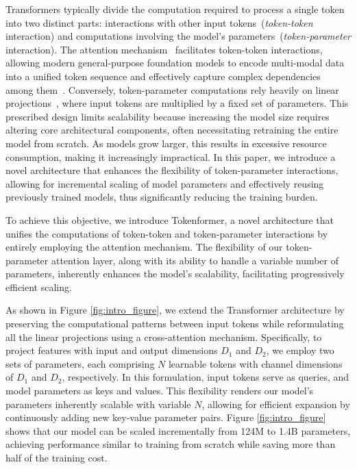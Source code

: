\documentclass{article} %
\newcommand{\ourmethod}{Tokenformer\xspace}
\begin{document}
Transformers typically divide the computation required to process a single token into two distinct parts: interactions with other input tokens~(\textit{token-token} interaction) and computations involving the model's parameters~(\textit{token-parameter} interaction). The attention mechanism~\citep{vaswani2017attention} facilitates token-token interactions, allowing modern general-purpose foundation models to encode multi-modal data into a unified token sequence and effectively capture complex dependencies among them~\citep{liu2023visual,zhu2023minigpt,wang2023image}. 
Conversely, token-parameter computations rely heavily on linear projections~\citep{dunford1988linear}, where input tokens are multiplied by a fixed set of parameters. 
This prescribed design limits scalability because increasing the model size requires altering core architectural components, often necessitating retraining the entire model from scratch.
As models grow larger, this results in excessive resource consumption, making it increasingly impractical.
In this paper, we introduce a novel architecture that enhances the flexibility of token-parameter interactions, allowing for incremental scaling of model parameters and effectively reusing previously trained models, thus significantly reducing the training burden.

To achieve this objective, we introduce \ourmethod, a novel architecture that unifies the computations of token-token and token-parameter interactions by entirely employing the attention mechanism. The flexibility of our token-parameter attention layer, along with its ability to handle a variable number of parameters, inherently enhances the model's scalability, facilitating progressively efficient scaling.

As shown in Figure \ref{fig:intro_figure}, we extend the Transformer architecture by preserving the computational patterns between input tokens while reformulating all the linear projections using a cross-attention mechanism. Specifically, to project features with input and output dimensions $D_1$ and $D_2$, we employ two sets of parameters, each comprising $N$ learnable tokens with channel dimensions of $D_1$ and $D_2$, respectively. In this formulation, input tokens serve as queries, and model parameters as keys and values. This flexibility renders our model's parameters inherently scalable with variable $N$, allowing for efficient expansion by continuously adding new key-value parameter pairs. Figure \ref{fig:intro_figure} shows that our model can be scaled incrementally from 124M to 1.4B parameters, achieving performance similar to training from scratch while saving more than half of the training cost.
\end{document}
